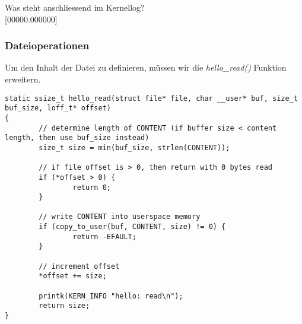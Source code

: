 Was steht anschliessend im Kernellog? \\

[00000.000000] \underline{\smash{\textcolor{red}{vfs\_procfs: init}}\hspace{0.34\textwidth}} \newline
[00000.000000] \underline{\smash{\textcolor{red}{hello: open}}\hspace{0.38\textwidth}} \newline
[00000.000000] \underline{\smash{\textcolor{red}{hello: read}}\hspace{0.385\textwidth}} \newline
[00000.000000] \underline{\smash{\textcolor{red}{hello: close}}\hspace{0.38\textwidth}} \newline
[00000.000000] \underline{\smash{\textcolor{red}{hello: open}}\hspace{0.38\textwidth}} \newline
[00000.000000] \underline{\smash{\textcolor{red}{hello: write}}\hspace{0.376\textwidth}} \newline
[00000.000000] \underline{\smash{\textcolor{red}{hello: close}}\hspace{0.38\textwidth}} \newline
[00000.000000] \underline{\smash{\textcolor{red}{vfs\_proc: exit}}\hspace{0.355\textwidth}} \newline

\subsubsection{Dateioperationen}

Um den Inhalt der Datei zu definieren, müssen wir die \emph{hello\_read()} Funktion erweitern.
\begin{lstlisting}
static ssize_t hello_read(struct file* file, char __user* buf, size_t buf_size, loff_t* offset)
{
        // determine length of CONTENT (if buffer size < content length, then use buf_size instead)
        size_t size = min(buf_size, strlen(CONTENT));

        // if file offset is > 0, then return with 0 bytes read
        if (*offset > 0) {
                return 0;
        }

        // write CONTENT into userspace memory
        if (copy_to_user(buf, CONTENT, size) != 0) {
                return -EFAULT;
        }

        // increment offset
        *offset += size;

        printk(KERN_INFO "hello: read\n");
        return size;
}
\end{lstlisting}

